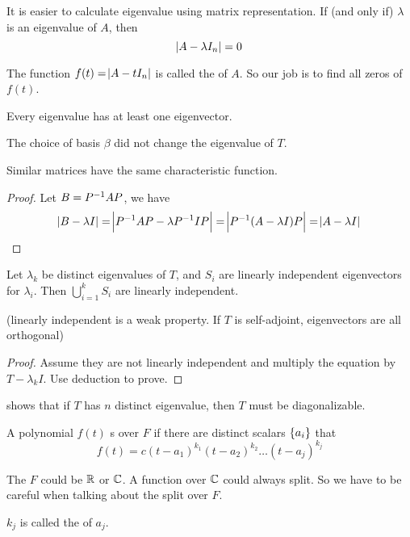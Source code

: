 It is easier to calculate eigenvalue using matrix representation. If (and only if) $\lambda$ is an eigenvalue of $A$, then 
\begin{equation}
    \abs{A - \lambda I_n} = 0
\end{equation}

The function $f(t) = \abs{A - t I_n}$ is called the  of $A$. So our job is to find all zeros of $f(t)$.


\begin{theorem}
    Every eigenvalue has at least one eigenvector.    
\end{theorem}


\begin{theorem}
    The choice of basis $\beta$ did not change the eigenvalue of $T$.
\end{theorem}

\begin{theorem}
Similar matrices have the same characteristic function.    
\end{theorem}

\begin{proof}
    Let $B = {P}^{-1}AP$, we have 
    \begin{equation}
        \abs{B - \lambda I} = \abs{{P}^{-1} A P - \lambda {P}^{-1} I P} = \abs{{P}^{-1} (A - \lambda I) P} = \abs{A - \lambda I}
    \end{equation}
\end{proof}


\begin{theorem}\label{eigenvector_sets_are_linearly_independent}
    Let $\lambda_k$ be distinct eigenvalues of $T$, and $S_i$ are linearly independent eigenvectors for $\lambda_i$. Then $\bigcup_{i=1}^k S_i$ are linearly independent.
    
    (linearly independent is a weak property. If $T$ is self-adjoint, eigenvectors are all orthogonal)
\end{theorem}
\begin{proof}
    Assume they are not linearly independent and multiply the equation by $T - \lambda_k I$. Use deduction to prove.
\end{proof}

 shows that if $T$ has $n$ distinct eigenvalue, then $T$ must be diagonalizable.

\begin{definition}
    A polynomial $f(t)$ s over $F$ if there are distinct scalars $\set{a_i}$ that
    \begin{equation}
        f(t) = c (t - a_1)^{k_1} (t - a_2)^{k_2} \hdots (t - a_j)^{k_j}
    \end{equation}
    
    The $F$ could be $\mathbb{R}$ or $\mathbb{C}$. A function over $\mathbb{C}$ could always split. So we have to be careful when talking about the split over $F$.
    
    $k_j$ is called the  of $a_j$.
\end{definition}

